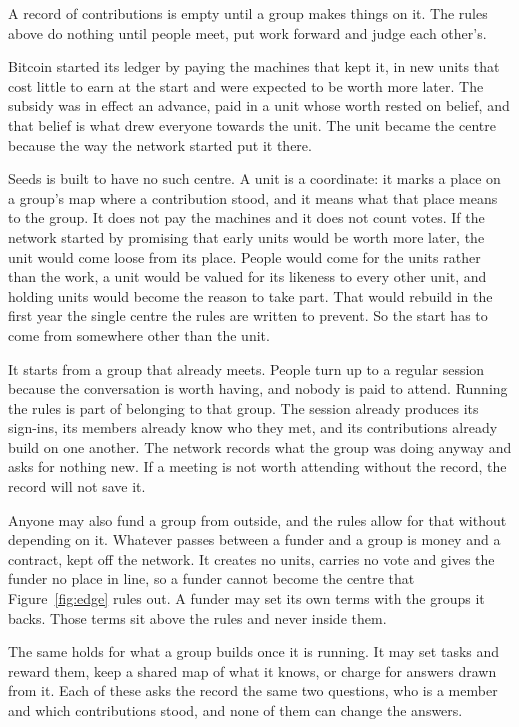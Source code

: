 \documentclass[11pt,a4paper]{article}
\begin{document}
A record of contributions is empty until a group makes things on it. The rules above do nothing until people meet, put work forward and judge each other's.

Bitcoin started its ledger by paying the machines that kept it, in new units that cost little to earn at the start and were expected to be worth more later. The subsidy was in effect an advance, paid in a unit whose worth rested on belief, and that belief is what drew everyone towards the unit. The unit became the centre because the way the network started put it there.

Seeds is built to have no such centre. A unit is a coordinate: it marks a place on a group's map where a contribution stood, and it means what that place means to the group. It does not pay the machines and it does not count votes. If the network started by promising that early units would be worth more later, the unit would come loose from its place. People would come for the units rather than the work, a unit would be valued for its likeness to every other unit, and holding units would become the reason to take part. That would rebuild in the first year the single centre the rules are written to prevent. So the start has to come from somewhere other than the unit.

It starts from a group that already meets. People turn up to a regular session because the conversation is worth having, and nobody is paid to attend. Running the rules is part of belonging to that group. The session already produces its sign-ins, its members already know who they met, and its contributions already build on one another. The network records what the group was doing anyway and asks for nothing new. If a meeting is not worth attending without the record, the record will not save it.

Anyone may also fund a group from outside, and the rules allow for that without depending on it. Whatever passes between a funder and a group is money and a contract, kept off the network. It creates no units, carries no vote and gives the funder no place in line, so a funder cannot become the centre that Figure~\ref{fig:edge} rules out. A funder may set its own terms with the groups it backs. Those terms sit above the rules and never inside them.

The same holds for what a group builds once it is running. It may set tasks and reward them, keep a shared map of what it knows, or charge for answers drawn from it. Each of these asks the record the same two questions, who is a member and which contributions stood, and none of them can change the answers.
\end{document}

